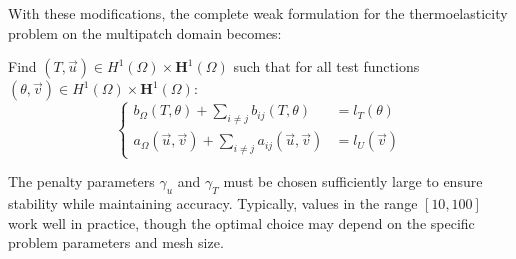 \documentclass[a4paper,12pt,twoside]{report}
\newcommand{\mtr}{\mathbb{R}}
\begin{document}

With these modifications, the complete weak formulation for the thermoelasticity problem on the multipatch domain becomes:
\begin{tcolorbox}
Find $(T, \vec u) \in H^1(\Omega) \times \boldsymbol{H}^1(\Omega)$ such that for all test functions $(\theta, \vec v) \in H^1(\Omega) \times \boldsymbol{H}^1(\Omega)$:
\begin{equation}
	\left\{
	\begin{aligned}
		b_{\Omega}(T, \theta) + \sum_{i \neq j} b_{ij}(T, \theta) &= l_{T}(\theta) \\
		a_{\Omega}(\vec u, \vec v) + \sum_{i \neq j} a_{ij}(\vec u, \vec v) &= l_{U}(\vec v)
	\end{aligned}
	\right.
\end{equation}
\end{tcolorbox}

The penalty parameters $\gamma_u$ and $\gamma_T$ must be chosen sufficiently large to ensure stability while maintaining accuracy. Typically, values in the range $[10, 100]$ work well in practice, though the optimal choice may depend on the specific problem parameters and mesh size.
\end{document}
